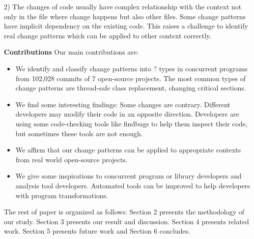 2) The changes of code usually have complex relationship with the context not only in the file where change happens but also other files. Some change patterns have implicit dependency on the existing code. This raises a challenge to identify real change patterns which can be applied to other context correctly.

\textbf{Contributions} Our main contributions are:

\begin{itemize}
	\item We identify and classify change patterns into ? types in concurrent programs from 102,028 commits of 7 open-source projects. The most common types of change patterns are thread-safe class replacement, changing critical sections.
	\item We find some interesting findings: Some changes are contrary. Different developers may modify their code in an opposite direction. Developers are using some code-checking tools like findbugs to help them inspect their code, but sometimes these tools are not enough.
	\item We affirm that our change patterns can be applied to appropriate  contexts from real world open-source projects.
	\item We give some inspirations to concurrent program or library developers and analysis tool developers. Automated tools can be improved to help developers with program transformations.
\end{itemize}

The rest of paper is organized as follows: Section 2 presents the methodology of our study. Section 3 presents our result and discussion. Section 4 presents related work. Section 5 presents future work and Section 6 concludes.
